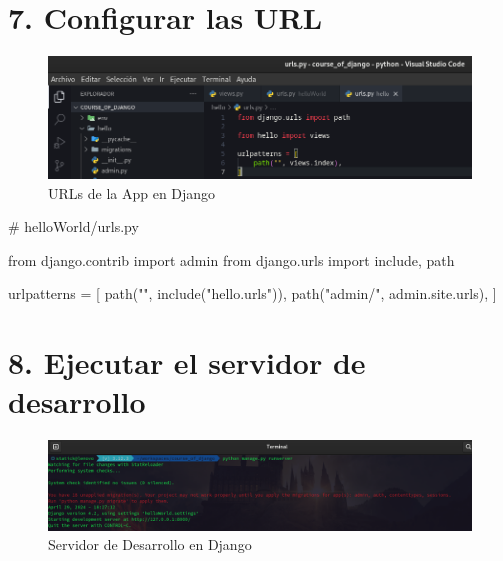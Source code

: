 \documentclass[
  a4paper,
  DIV=11,
  numbers=noendperiod,
  onepage,
  openany]{scrreprt}
\newenvironment{Shaded}{\begin{snugshade}}{\end{snugshade}}
\newcommand{\CommentTok}[1]{\textcolor[rgb]{0.37,0.37,0.37}{#1}}
\newcommand{\ImportTok}[1]{\textcolor[rgb]{0.00,0.46,0.62}{#1}}
\newcommand{\NormalTok}[1]{\textcolor[rgb]{0.00,0.23,0.31}{#1}}
\newcommand{\OperatorTok}[1]{\textcolor[rgb]{0.37,0.37,0.37}{#1}}
\newcommand{\StringTok}[1]{\textcolor[rgb]{0.13,0.47,0.30}{#1}}
\begin{document}
\section{7. Configurar las URL}\label{configurar-las-url}

\begin{figure}[H]

{\centering \includegraphics{images/urls_app_django.png}

}

\caption{URLs de la App en Django}

\end{figure}%

\begin{Shaded}
\begin{Highlighting}[]
\CommentTok{\# helloWorld/urls.py}

\ImportTok{from}\NormalTok{ django.contrib }\ImportTok{import}\NormalTok{ admin}
\ImportTok{from}\NormalTok{ django.urls }\ImportTok{import}\NormalTok{ include, path}

\NormalTok{urlpatterns }\OperatorTok{=}\NormalTok{ [}
\NormalTok{    path(}\StringTok{""}\NormalTok{, include(}\StringTok{"hello.urls"}\NormalTok{)),}
\NormalTok{    path(}\StringTok{"admin/"}\NormalTok{, admin.site.urls),}
\NormalTok{]}
\end{Highlighting}
\end{Shaded}

\section{8. Ejecutar el servidor de
desarrollo}\label{ejecutar-el-servidor-de-desarrollo}

\begin{figure}[H]

{\centering \includegraphics{images/servidor_desarrollo_django.png}

}

\caption{Servidor de Desarrollo en Django}

\end{figure}%
\end{document}
